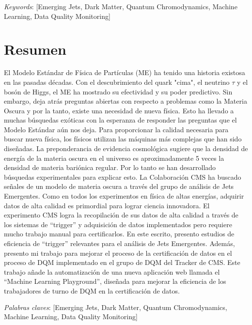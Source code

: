\vspace*{1cm}

\textit{Keywords}:  [Emerging Jets, Dark Matter, Quantum Chromodynamics, Machine Learning, Data Quality Monitoring]


\chapter*{Resumen}

El Modelo Estándar de Física de Partículas (ME) ha tenido una historia existosa en las pasadas décadas.
Con el descubrimiento del quark "cima", el neutrino $\tau$ y el bosón de Higgs, el ME ha mostrado su efectividad y su poder predictivo.
Sin embargo, deja atrás preguntas abiertas con respecto a problemas como la Materia Oscura y por la tanto, existe una necesidad de nueva física.
Esto ha llevado a muchas búsquedas exóticas con la esperanza de responder las preguntas que el Modelo Estándar aún nos deja.
Para proporcionar la calidad necesaria para buscar nueva física, los físicos utilizan las máquinas más complejas que han sido diseñadas. La preponderancia de evidencia cosmológica sugiere que la densidad de energía de la materia oscura en el universo es aproximadamente 5 veces la densidad de materia bariónica regular. Por lo tanto se han desarrollado búsquedas experimentales para explicar esto.
La Colaboración CMS ha buscado señales de un modelo de materia oscura a través del grupo de análisis de Jets Emergentes. Como en todos los experimentos en física de altas energías, adquirir datos de alta calidad es primordial para lograr ciencia innovadora.
El experimento CMS logra la recopilación de sus datos de alta calidad a través de los sistemas de ``trigger'' y adquisición de datos implementados pero requiere mucho trabajo manual para certificarlos. En este escrito, presento estudios de eficiencia de ``trigger'' relevantes para el análisis de Jets Emergentes. Además, presento mi trabajo para mejorar el proceso de la certificación de datos en el proceso de DQM implementado en el grupo de DQM del Tracker de CMS. Este trabajo añade la automatización de una nueva aplicación web llamada el ``Machine Learning Playground'', diseñada para mejorar la eficiencia de los trabajadores de turno de DQM en la certificación de datos.



\textit{Palabras claves}:  [Emerging Jets, Dark Matter, Quantum Chromodynamics, Machine Learning, Data Quality Monitoring]
